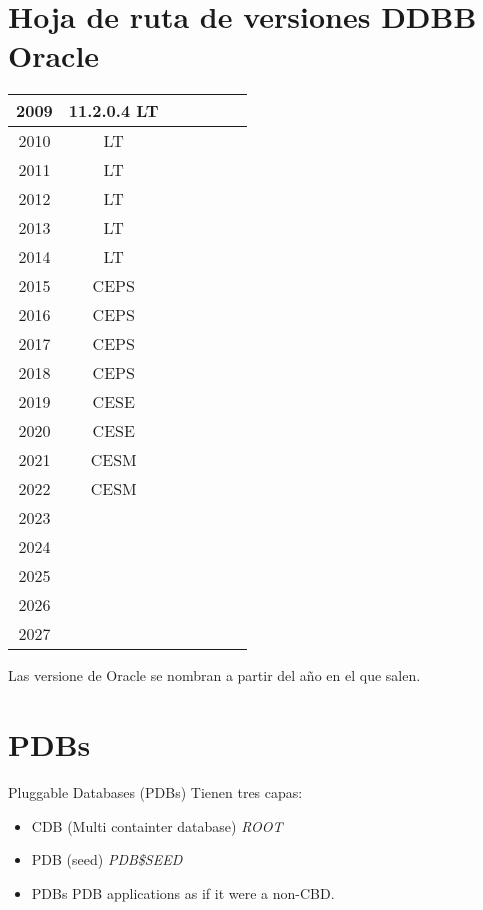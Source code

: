 \section{Hoja de ruta de versiones DDBB Oracle}
\begin{center}
	\begin{tabular}{| c | c | c | c | c | c | c |}
		\hline
		2009 & 11.2.0.4 LT& & & & & \\
		\hline
		2010 & LT & & & & & \\
		\hline
		2011 & LT & & & & & \\
		\hline
		2012 & LT& & & & & \\
		\hline
		2013 & LT & & & & & \\
		\hline
		2014 & LT & & & & & \\
		\hline
		2015 & CEPS & & & & & \\
		\hline
		2016 & CEPS & & & & & \\
		\hline
		2017 & CEPS& & & & & \\
		\hline
		2018 & CEPS & & & & & \\
		\hline
		2019 & CESE & & & & & \\
		\hline
		2020 & CESE & & & & & \\
		\hline
		2021 & CESM & & & & & \\
		\hline
		2022 & CESM & & & & & \\
		\hline
		2023 & & & & & & \\
		\hline
		2024 & & & & & & \\
		\hline
		2025 & & & & & & \\
		\hline
		2026 & & & & & & \\
		\hline
		2027 & & & & & & \\
		\hline
	\end{tabular}
\end{center}
Las versione de Oracle se nombran a partir del a\~{n}o en el que salen.

\section{PDBs}
Pluggable Databases (PDBs)
Tienen tres capas:
\begin{itemize}
	\item CDB (Multi containter database) \textit{ROOT}
	\item PDB (seed) \textit{PDB\$SEED}
	\item  PDBs PDB applications as if it were a non-CBD.
\end{itemize}

